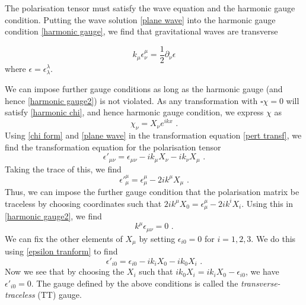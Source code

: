 \documentclass[11pt]{cuthesis}
\newcommand{\mn}{_{\mu\nu}}
\newcommand{\fs}{\text{ .}}
\begin{document}
The polarisation tensor must satisfy the wave equation and the harmonic gauge condition. Putting the wave solution \ref{plane wave} into the harmonic gauge condition \ref{harmonic gauge}, we find that gravitational waves are transverse

\begin{equation}  \label{harmonic gauge2}
k_\mu \epsilon^\mu_\nu = \frac{1}{2}\partial_\nu \epsilon
\end{equation}
where $\epsilon=\epsilon^\lambda_\lambda$.

We can impose further gauge conditions as long as the harmonic gauge (and hence \ref{harmonic gauge2}) is not violated. As any transformation with $\square \chi = 0$ will satisfy \ref{harmonic chi}, and hence harmonic gauge condition, we express $\chi$ as 
\begin{equation} \label{chi form}
\chi_\nu = X_\nu e^{ikx} \fs
\end{equation}
Using \ref{chi form} and \ref{plane wave} in the transformation equation \ref{pert transf}, we find the transformation equation for the polarisation tensor
\begin{equation} \label{epsilon tranform}
\epsilon'\mn = \epsilon\mn -ik_\mu X_\nu - ik_\nu X_\mu \fs
\end{equation}
Taking the trace of this, we find
\begin{equation}
\epsilon'^\mu_\mu = \epsilon^\mu_\mu - 2ik^\mu X_\mu \fs
\end{equation}
Thus, we can impose the further gauge condition that the polarisation matrix be traceless by choosing coordinates such that $2ik^\mu X_0 = \epsilon^\mu_\mu - 2ik^i X_i$. Using this in \ref{harmonic gauge2}, we find
\begin{equation} \label{harmonic gauge 3}
k^\mu \epsilon\mn = 0 \fs
\end{equation}
We can fix the other elements of $X_\mu$ by setting $\epsilon_{i 0} = 0$ for $i=1,2,3$. We do this using \ref{epsilon tranform} to find
\begin{equation} \label{epsilon 0}
\epsilon'_{i 0} = \epsilon_{i 0} -ik_i X_0 - ik_0 X_i \fs
\end{equation}
Now we see that by choosing the $X_i$ such that $ ik_0 X_i = ik_i X_0 - \epsilon_{i 0}$, we have $\epsilon'_{i 0} = 0$. The gauge defined by the above conditions is called the \textit{transverse-traceless} (TT) gauge.

\end{document}
